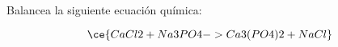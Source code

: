 Balancea la siguiente ecuación química:

\[
    \ce{CaCl2 + Na3PO4 -> Ca3(PO4)2 + NaCl}
\]

\begin{solutionbox}{5cm}

\end{solutionbox}